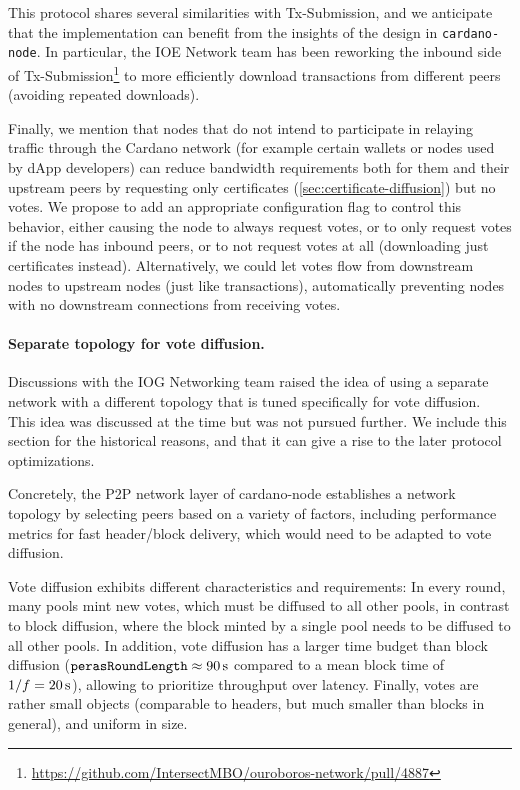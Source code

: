 This protocol shares several similarities with Tx-Submission, and we anticipate that the implementation can benefit from the insights of the design in \texttt{cardano-node}.
In particular, the IOE Network team has been reworking the inbound side of Tx-Submission\footnote{\url{https://github.com/IntersectMBO/ouroboros-network/pull/4887}} to more efficiently download transactions from different peers (avoiding repeated downloads).

Finally, we mention that nodes that do not intend to participate in relaying traffic through the Cardano network (for example certain wallets or nodes used by dApp developers) can reduce bandwidth requirements both for them and their upstream peers by requesting only certificates (\cref{sec:certificate-diffusion}) but no votes.
We propose to add an appropriate configuration flag to control this behavior, either causing the node to always request votes, or to only request votes if the node has inbound peers, or to not request votes at all (downloading just certificates instead).
Alternatively, we could let votes flow from downstream nodes to upstream nodes (just like transactions), automatically preventing nodes with no downstream connections from receiving votes.

\paragraph{Separate topology for vote diffusion.}

Discussions with the IOG Networking team raised the idea of using a separate network with a different topology
that is tuned specifically for vote diffusion. This idea was discussed at the time but was not pursued further.
We include this section for the historical reasons, and that it can give a rise to the later protocol optimizations.

Concretely, the P2P network layer of cardano-node establishes a network topology by selecting peers based on a variety of factors, including performance metrics for fast header/block delivery, which would need to be adapted to vote diffusion.

Vote diffusion exhibits different characteristics and requirements:
In every round, many pools mint new votes, which must be diffused to all other pools, in contrast to block diffusion, where the block minted by a single pool needs to be diffused to all other pools.
In addition, vote diffusion has a larger time budget than block diffusion ($\perasRoundSlots \approx \qty{90}{\s}$ compared to a mean block time of $1/\asc = \qty{20}{\s}$), allowing to prioritize throughput over latency.
Finally, votes are rather small objects (comparable to headers, but much smaller than blocks in general), and uniform in size.

